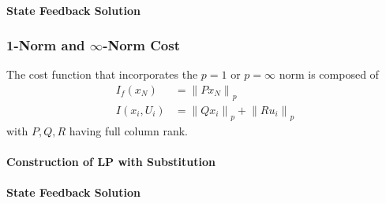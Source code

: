 \paragraph{State Feedback Solution}


\subsubsection[1-Norm and Inf-Norm Cost]{1-Norm and $\infty$-Norm Cost}

The cost function that incorporates the $p=1$ or $p=\infty$ norm is composed of
\begin{align*}
    I_f(x_N)   & = {\lVert Px_N \rVert}_p                          \\
    I(x_i,U_i) & = {\lVert Qx_i \rVert}_p + {\lVert Ru_i \rVert}_p
\end{align*}
with $P,Q,R$ having full column rank.


\paragraph{Construction of LP with Substitution}


\paragraph{State Feedback Solution}

